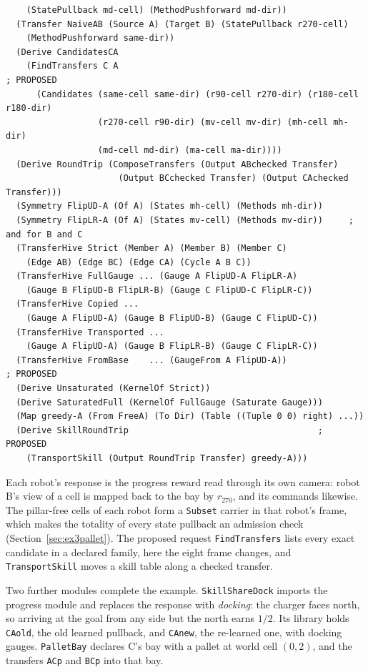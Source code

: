 \documentclass[11pt]{article}
\newcommand{\code}[1]{\texttt{#1}}
\theoremstyle{definition}
\theoremstyle{plain}
\begin{document}
\begin{lstlisting}
    (StatePullback md-cell) (MethodPushforward md-dir))
  (Transfer NaiveAB (Source A) (Target B) (StatePullback r270-cell)
    (MethodPushforward same-dir))
  (Derive CandidatesCA
    (FindTransfers C A                                                 ; PROPOSED
      (Candidates (same-cell same-dir) (r90-cell r270-dir) (r180-cell r180-dir)
                  (r270-cell r90-dir) (mv-cell mv-dir) (mh-cell mh-dir)
                  (md-cell md-dir) (ma-cell ma-dir))))
  (Derive RoundTrip (ComposeTransfers (Output ABchecked Transfer)
                      (Output BCchecked Transfer) (Output CAchecked Transfer)))
  (Symmetry FlipUD-A (Of A) (States mh-cell) (Methods mh-dir))
  (Symmetry FlipLR-A (Of A) (States mv-cell) (Methods mv-dir))     ; and for B and C
  (TransferHive Strict (Member A) (Member B) (Member C)
    (Edge AB) (Edge BC) (Edge CA) (Cycle A B C))
  (TransferHive FullGauge ... (Gauge A FlipUD-A FlipLR-A)
    (Gauge B FlipUD-B FlipLR-B) (Gauge C FlipUD-C FlipLR-C))
  (TransferHive Copied ...
    (Gauge A FlipUD-A) (Gauge B FlipUD-B) (Gauge C FlipUD-C))
  (TransferHive Transported ...
    (Gauge A FlipUD-A) (Gauge B FlipLR-B) (Gauge C FlipLR-C))
  (TransferHive FromBase    ... (GaugeFrom A FlipUD-A))                ; PROPOSED
  (Derive Unsaturated (KernelOf Strict))
  (Derive SaturatedFull (KernelOf FullGauge (Saturate Gauge)))
  (Map greedy-A (From FreeA) (To Dir) (Table ((Tuple 0 0) right) ...))
  (Derive SkillRoundTrip                                     ; PROPOSED
    (TransportSkill (Output RoundTrip Transfer) greedy-A)))
\end{lstlisting}
Each robot's response is the progress reward read through its own camera: robot B's view of a cell is
mapped back to the bay by $r_{270}$, and its commands likewise. The pillar-free cells of each robot
form a \code{Subset} carrier in that robot's frame, which makes the totality of every state pullback
an admission check (Section~\ref{sec:ex3pallet}). The proposed request \code{FindTransfers} lists every
exact candidate in a declared family, here the eight frame changes, and \code{TransportSkill} moves a
skill table along a checked transfer.

Two further modules complete the example. \code{SkillShareDock} imports the progress module and
replaces the response with \emph{docking}: the charger faces north, so arriving at the goal from any
side but the north earns $1/2$. Its library holds \code{CAold}, the old learned pullback, and
\code{CAnew}, the re-learned one, with docking gauges. \code{PalletBay} declares C's bay with a pallet
at world cell $(0,2)$, and the transfers \code{ACp} and \code{BCp} into that bay.
\end{document}
